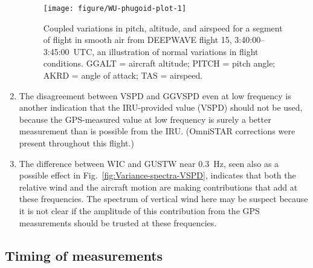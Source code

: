 \documentclass[12pt,twoside,english]{article}\usepackage[]{graphicx}\usepackage[]{color}
\newenvironment{knitrout}{}{} %
\let\OrgIndex\index
\renewcommand*{\index}[1]{\OrgIndex{#1}}
\begin{document}
\begin{enumerate}
\begin{knitrout}
\begin{figure}
{\centering \texttt{[image: figure/WU-phugoid-plot-1]} 

}

\caption[Coupled variations in pitch, altitude, and airspeed for a segment of flight in smooth air, illustrating normal variations in flight conditions.]{Coupled variations in pitch, altitude, and airspeed for a segment of flight in smooth air from DEEPWAVE flight 15, 3:40:00--3:45:00~UTC, an illustration of normal variations in flight conditions. GGALT = aircraft altitude; PITCH = pitch angle; AKRD = angle of attack; TAS = airspeed.}\label{fig:phugoid-plot}
\end{figure}


\end{knitrout}

%

\item The disagreement between VSPD and GGVSPD even at low frequency is another indication that the IRU-provided value (VSPD) should not be used, because the GPS-measured value at low frequency is surely a better measurement than is possible from the IRU. (OmniSTAR corrections were present throughout this flight.)  
\item The difference between WIC and GUSTW near 0.3~Hz, seen also as a possible effect in Fig.~\ref{fig:Variance-spectra-VSPD}, indicates that both the relative wind and the aircraft motion are making contributions that add at these frequencies. The spectrum of vertical wind here may be suspect because it is not clear if the amplitude of this contribution from the GPS measurements should be trusted at these frequencies. 
\end{enumerate}

\subsection{Timing of measurements\label{sub:Timing}}
\end{document}
